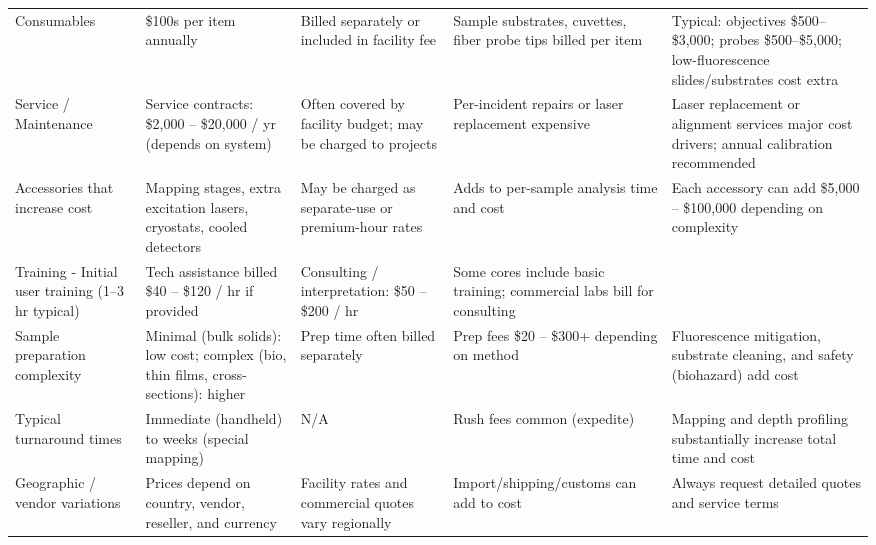 \documentclass{iopjournal}
\begin{document}
\begin{table}[htbp]
\begin{threeparttable}
\begin{longtable}{@{} L P P P P @{}}
      Consumables
        & \$100s per item annually
        & Billed separately or included in facility fee
        & Sample substrates, cuvettes, fiber probe tips billed per item
        & Typical: objectives \$500--\$3,000; probes \$500--\$5,000; low-fluorescence slides/substrates cost extra \\

      Service / Maintenance
        & Service contracts: \$2,000 -- \$20,000 / yr (depends on system)
        & Often covered by facility budget; may be charged to projects
        & Per-incident repairs or laser replacement expensive
        & Laser replacement or alignment services major cost drivers; annual calibration recommended \\

      Accessories that increase cost
        & Mapping stages, extra excitation lasers, cryostats, cooled detectors
        & May be charged as separate-use or premium-hour rates
        & Adds to per-sample analysis time and cost
        & Each accessory can add \$5,000 -- \$100,000 depending on complexity \\

      Training - Initial user training (1--3 hr typical)
        & Tech assistance billed \$40 -- \$120 / hr if provided
        & Consulting / interpretation: \$50 -- \$200 / hr
        & Some cores include basic training; commercial labs bill for consulting
        & \\

      Sample preparation complexity
        & Minimal (bulk solids): low cost; complex (bio, thin films, cross-sections): higher
        & Prep time often billed separately
        & Prep fees \$20 -- \$300+ depending on method
        & Fluorescence mitigation, substrate cleaning, and safety (biohazard) add cost \\

      Typical turnaround times
        & Immediate (handheld) to weeks (special mapping)
        & N/A
        & Rush fees common (expedite)
        & Mapping and depth profiling substantially increase total time and cost \\

      Geographic / vendor variations
        & Prices depend on country, vendor, reseller, and currency
        & Facility rates and commercial quotes vary regionally
        & Import/shipping/customs can add to cost
        & Always request detailed quotes and service terms \\


\end{longtable}
\end{threeparttable}
\end{table}
\end{document}
